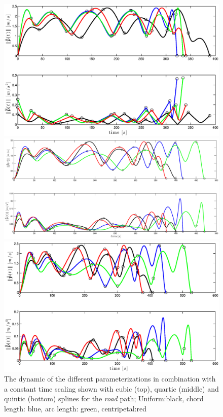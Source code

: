 \begin{figure}[H]
  \begin{minipage}[t]{0.9\textwidth}
    \includegraphics[width = \textwidth]{graphics/Parameterization3_road_vel_acc.eps}
  \end{minipage}
  \vfill
    \begin{minipage}[t]{0.9\textwidth}
    \includegraphics[width = \textwidth]{graphics/Parameterization4_road_vel_acc.eps}
  \end{minipage}
  \vfill
    \begin{minipage}[t]{0.9\textwidth}
    \includegraphics[width = \textwidth]{graphics/Parameterization5_road_vel_acc.eps}
  \end{minipage}
  \caption{The dynamic of the different parameterizations in combination with a constant time scaling shown with cubic (top), quartic (middle) and quintic (bottom) splines for the \textit{road} path; Uniform:black, chord length: blue, arc length: green, centripetal:red}
  \label{fig:parameterization_cqq}
\end{figure}

